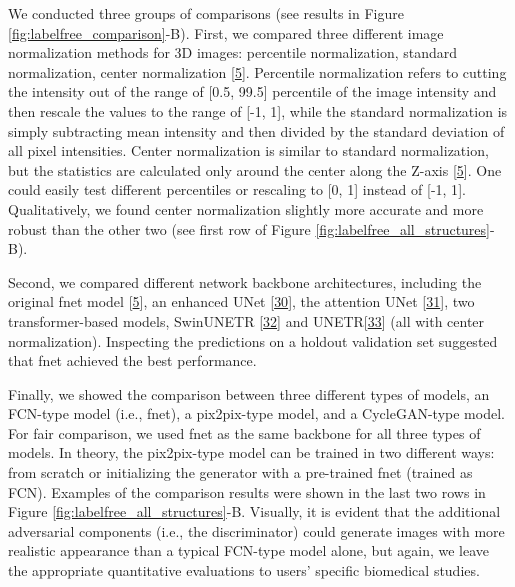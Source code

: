 We conducted three groups of comparisons (see results in Figure \ref{fig:labelfree_comparison}-B). First, we compared three different image normalization methods for 3D images: percentile normalization, standard normalization, center normalization {[}\protect\hyperlink{ref-Yq8wZ6hc}{5}{]}. Percentile normalization refers to cutting the intensity out of the range of {[}0.5, 99.5{]} percentile of the image intensity and then rescale the values to the range of {[}-1, 1{]}, while the standard normalization is simply subtracting mean intensity and then divided by the standard deviation of all pixel intensities. Center normalization is similar to standard normalization, but the statistics are calculated only around the center along the Z-axis {[}\protect\hyperlink{ref-Yq8wZ6hc}{5}{]}. One could easily test different percentiles or rescaling to {[}0, 1{]} instead of {[}-1, 1{]}. Qualitatively, we found center normalization slightly more accurate and more robust than the other two (see first row of Figure \ref{fig:labelfree_all_structures}-B).

Second, we compared different network backbone architectures, including the original fnet model {[}\protect\hyperlink{ref-Yq8wZ6hc}{5}{]}, an enhanced UNet {[}\protect\hyperlink{ref-M7480NLD}{30}{]}, the attention UNet {[}\protect\hyperlink{ref-OCow1hly}{31}{]}, two transformer-based models, SwinUNETR {[}\protect\hyperlink{ref-ZWL3IrVc}{32}{]} and UNETR{[}\protect\hyperlink{ref-XCKUntOB}{33}{]} (all with center normalization). Inspecting the predictions on a holdout validation set suggested that fnet achieved the best performance.

Finally, we showed the comparison between three different types of models, an FCN-type model (i.e., fnet), a pix2pix-type model, and a CycleGAN-type model. For fair comparison, we used fnet as the same backbone for all three types of models. In theory, the pix2pix-type model can be trained in two different ways: from scratch or initializing the generator with a pre-trained fnet (trained as FCN). Examples of the comparison results were shown in the last two rows in Figure \ref{fig:labelfree_all_structures}-B. Visually, it is evident that the additional adversarial components (i.e., the discriminator) could generate images with more realistic appearance than a typical FCN-type model alone, but again, we leave the appropriate quantitative evaluations to users' specific biomedical studies.

